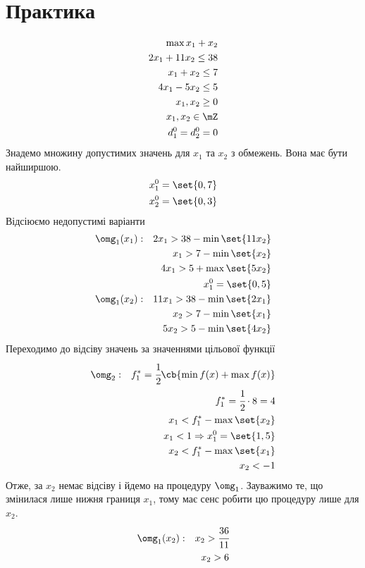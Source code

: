 \section{Практика}
\begin{tsk}\label{exs:pr:3}
\begin{eqnarray}
\max x_1+x_2\\
2x_1 + 11x_2 \leq 38 \\
x_1 + x_2 \leq 7\\
4x_1 - 5x_2 \leq 5 \\
x_1,x_2\geq 0\\
x_1,x_2\in\mZ\\
d_1^0 = d_2^0 = 0
\end{eqnarray} 
Знадемо множину допустимих значень для $x_1$ та $x_2$ з обмежень. Вона має бути найширшою.
\begin{eqnarray}
x_1^0 = \set{0,7}\\
x_2^0 = \set{0,3}
\end{eqnarray}
Відсіюємо недопустимі варіанти
\begin{eqnarray}
&\omg_1(x_1):&2x_1 > 38 - \min \set{11x_2}\\
&&x_1 > 7 -\min\set{x_2}\\
&&4x_1 >5 + \max\set{5x_2}\\
&&x_1^0 = \set{0,5}\\
&\omg_1(x_2):&11x_1 > 38 - \min\set{2x_1}\\
&&x_2>7 - \min\set{x_1} \\
&&5x_2 > 5 - \min\set{4x_2}\\
\end{eqnarray}
Переходимо до відсіву значень за значеннями цільової функції
\begin{eqnarray}
&\omg_2:&f_1^\ast = \cfrac12 \cb{\min f(x) +\max f(x)}\\
&& f_1^\ast = \cfrac12\cdot 8 = 4 \\
&& x_1 < f_1^\ast - \max\set{x_2}\\
&& x_1 < 1 \Rightarrow x_1^0 = \set{1,5}\\
&& x_2 < f_1^\ast - \max\set{x_1}\\
&& x_2 < -1 
\end{eqnarray}
Отже, за $x_2$ немає відсіву і йдемо на процедуру $\omg_1$. Зауважимо те, що змінилася лише нижня границя $x_1$, тому має сенс робити цю процедуру лише для $x_2$.
\begin{eqnarray}
&\omg_1(x_2):&x_2 > \cfrac{36}{11} \\
&& x_2 > 6 \\

\end{eqnarray}
\end{tsk}
